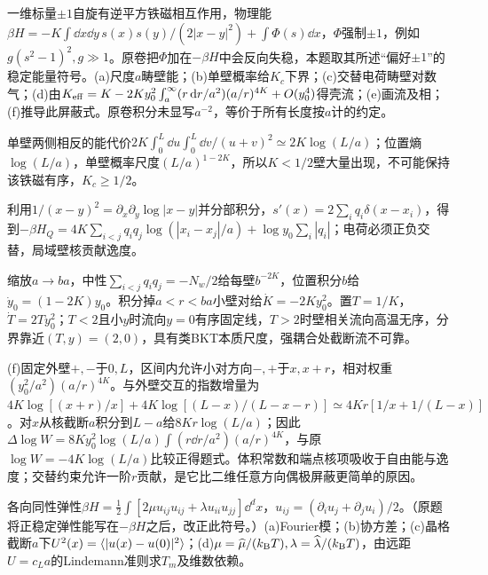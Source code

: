 \begin{exercise}[原题4(a)--(f)]\label{p:334-6-4}
一维标量$\pm1$自旋有逆平方铁磁相互作用，物理能$\beta H=-K\int\dd x\dd y\,s(x)s(y)/(2|x-y|^2)+\int\Phi(s)\dd x$，$\Phi$强制$\pm1$，例如$g(s^2-1)^2,g\gg1$。原卷把$\Phi$加在$-\beta H$中会反向失稳，本题取其所述“偏好$\pm1$”的稳定能量符号。(a)尺度$a$畴壁能；(b)单壁概率给$K_c$下界；(c)交替电荷畴壁对数气；(d)由$K_{\rm eff}=K-2Ky_0^2\int_a^\infty(r\,\mathrm d r/a^2)(a/r)^{4K}+O(y_0^4)$得壳流；(e)画流及相；(f)推导此屏蔽式。原卷积分未显写$a^{-2}$，等价于所有长度按$a$计的约定。
\end{exercise}
\begin{solution}
单壁两侧相反的能代价$2K\int_0^L\dd u\int_0^L\dd v/(u+v)^2\simeq2K\log(L/a)$；位置熵$\log(L/a)$，单壁概率尺度$(L/a)^{1-2K}$，所以$K<1/2$壁大量出现，不可能保持该铁磁有序，$K_c\ge1/2$。

利用$1/(x-y)^2=\partial_x\partial_y\log|x-y|$并分部积分，$s'(x)=2\sum_iq_i\delta(x-x_i)$，得到$-\beta H_Q=4K\sum_{i<j}q_iq_j\log(|x_i-x_j|/a)+\log y_0\sum_i|q_i|$；电荷必须正负交替，局域壁核贡献逸度。

缩放$a\to ba$，中性$\sum_{i<j}q_iq_j=-N_w/2$给每壁$b^{-2K}$，位置积分$b$给$\dot y_0=(1-2K)y_0$。积分掉$a<r<ba$小壁对给$\dot K=-2Ky_0^2$。置$T=1/K$，$\dot T=2Ty_0^2$；$T<2$且小$y$时流向$y=0$有序固定线，$T>2$时壁相关流向高温无序，分界靠近$(T,y)=(2,0)$，具有类BKT本质尺度，强耦合处截断流不可靠。
\begin{center}\end{center}

(f)固定外壁$+,-$于$0,L$，区间内允许小对方向$-,+$于$x,x+r$，相对权重$(y_0^2/a^2)(a/r)^{4K}$。与外壁交互的指数增量为$4K\log[(x+r)/x]+4K\log[(L-x)/(L-x-r)]\simeq4Kr[1/x+1/(L-x)]$。对$x$从核截断$a$积分到$L-a$给$8Kr\log(L/a)$；因此$\Delta\log W=8Ky_0^2\log(L/a)\int(r\dd r/a^2)(a/r)^{4K}$，与原$\log W=-4K\log(L/a)$比较正得题式。体积常数和端点核项吸收于自由能与逸度；交替约束允许一阶$r$贡献，是它比二维任意方向偶极屏蔽更简单的原因。
\end{solution}
\begin{exercise}[原题5(a)--(d)]\label{p:334-6-5}
各向同性弹性$\beta H=\tfrac12\int[2\mu u_{ij}u_{ij}+\lambda u_{ii}u_{jj}]\dd^dx$，$u_{ij}=(\partial_iu_j+\partial_ju_i)/2$。（原题将正稳定弹性能写在$-\beta H$之后，改正此符号。）(a)Fourier模；(b)协方差；(c)晶格截断$a$下$U^2(x)=\langle |u(x)-u(0)|^2\rangle$；(d)$\mu=\widehat\mu/(k_{\mathrm B} T),\lambda=\widehat\lambda/(k_{\mathrm B} T)$，由远距$U=c_La$的Lindemann准则求$T_m$及维数依赖。
\end{exercise}
